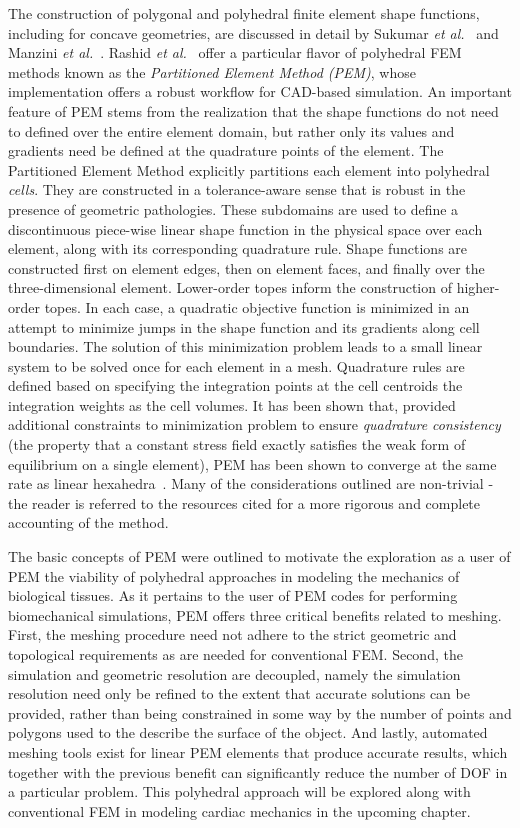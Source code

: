 The construction of polygonal and polyhedral finite element shape functions, including for concave geometries, are discussed in detail by Sukumar \textit{et al.}~\cite{sukumar_2006} and Manzini \textit{et al.}~\cite{manzini_2014}. Rashid \textit{et al.}~\cite{rashid_2012, rashid_2015} offer a particular flavor of polyhedral FEM methods known as the \textit{Partitioned Element Method (PEM)}, whose implementation offers a robust workflow for CAD-based simulation. An important feature of PEM stems from the realization that the shape functions do not need to defined over the entire element domain, but rather only its values and gradients need be defined at the quadrature points of the element. The Partitioned Element Method explicitly partitions each element into polyhedral \textit{cells}. They are constructed in a tolerance-aware sense that is robust in the presence of geometric pathologies. These subdomains are used to define a discontinuous piece-wise linear shape function in the physical space over each element, along with its corresponding quadrature rule. Shape functions are constructed first on element edges, then on element faces, and finally over the three-dimensional element. Lower-order topes inform the construction of higher-order topes. In each case, a quadratic objective function is minimized in an attempt to minimize jumps in the shape function and its gradients along cell boundaries. The solution of this minimization problem leads to a small linear system to be solved once for each element in a mesh. Quadrature rules are defined based on specifying the integration points at the cell centroids the integration weights as the cell volumes. It has been shown that, provided additional constraints to minimization problem to ensure \textit{quadrature consistency} (the property that a constant stress field exactly satisfies the weak form of equilibrium on a single element), PEM has been shown to converge at the same rate as linear hexahedra~\cite{rashid_2012}. Many of the considerations outlined are non-trivial - the reader is referred to the resources cited for a more rigorous and complete accounting of the method.


The basic concepts of PEM were outlined to motivate the exploration as a user of PEM the viability of polyhedral approaches in modeling the mechanics of biological tissues. As it pertains to the user of PEM codes for performing biomechanical simulations, PEM offers three critical benefits related to meshing. First, the meshing procedure need not adhere to the strict geometric and topological requirements as are needed for conventional FEM. Second, the simulation and geometric resolution are decoupled, namely the simulation resolution need only be refined to the extent that accurate solutions can be provided, rather than being constrained in some way by the number of points and polygons used to the describe the surface of the object. And lastly, automated meshing tools exist for linear PEM elements that produce accurate results, which together with the previous benefit can significantly reduce the number of DOF in a particular problem. This polyhedral approach will be explored along with conventional FEM in modeling cardiac mechanics in the upcoming chapter.
